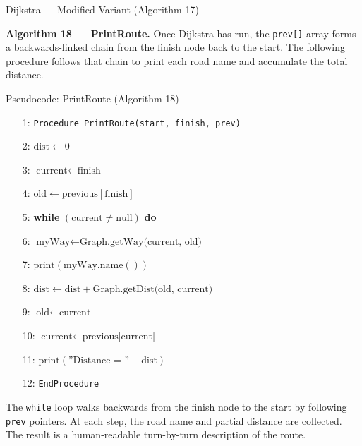 \documentclass[aspectratio=169,10pt]{beamer}
\begin{document}
\begin{frame}[allowframebreaks]{Dijkstra --- Modified Variant (Algorithm 17)}
  \framebreak

  \textbf{Algorithm 18 --- PrintRoute.}  Once Dijkstra has run, the
  \texttt{prev[]} array forms a backwards-linked chain from the finish
  node back to the start.  The following procedure follows that chain to
  print each road name and accumulate the total distance.

  \begin{block}{Pseudocode: PrintRoute (Algorithm 18)}
  \begin{enumerate}\setcounter{enumi}{0}
    \item[\footnotesize 1:] \texttt{Procedure PrintRoute(start, finish, prev)}
    \item[\footnotesize 2:] \quad $\text{dist} \leftarrow 0$
    \item[\footnotesize 3:] \quad $\text{current} \leftarrow \text{finish}$
    \item[\footnotesize 4:] \quad $\text{old} \leftarrow
      \text{previous}[\text{finish}]$
    \item[\footnotesize 5:] \quad \textbf{while} $(\text{current} \neq
      \text{null})$ \textbf{do}
    \item[\footnotesize 6:] \qquad $\text{myWay} \leftarrow
      \text{Graph.getWay(current, old)}$
    \item[\footnotesize 7:] \qquad $\text{print}(\text{myWay.name}())$
    \item[\footnotesize 8:] \qquad $\text{dist} \leftarrow \text{dist} +
      \text{Graph.getDist(old, current)}$
    \item[\footnotesize 9:] \qquad $\text{old} \leftarrow \text{current}$
    \item[\footnotesize 10:] \quad $\text{current} \leftarrow
      \text{previous[current]}$
    \item[\footnotesize 11:] \quad $\text{print}(\text{''Distance = ''} +
      \text{dist})$
    \item[\footnotesize 12:] \texttt{EndProcedure}
  \end{enumerate}
  \end{block}

  The \texttt{while} loop walks backwards from the finish node to the
  start by following \texttt{prev} pointers.  At each step, the road name
  and partial distance are collected.  The result is a human-readable
  turn-by-turn description of the route.
\end{frame}
\end{document}
